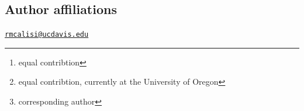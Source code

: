\newpage

\newpage

\hypertarget{author-affiliations}{%
\subsection{Author affiliations}\label{author-affiliations}}


\address{%
Rayna M Harris \footnote{equal contribtion}\\
University of California, Davis\\
\\
}


\address{%
Suzanne H. Austin \footnote{equal contribtion, currently at the
  University of Oregon}\\
University of California, Davis\\
\\
}


\address{%
Andrew S. Lang\\
University of New Hampshire\\
\\
}


\address{%
Victoria S. Farrar\\
University of California, Davis\\
\\
}


\address{%
April Booth\\
University of California, Davis\\
\\
}


\address{%
Tanner Feustel\\
University of California, Davis\\
\\
}


\address{%
Matthew D. MacManes\\
University of New Hampshire\\
\\
}


\address{%
Rebecca M. Calisi \footnote{corresponding author}\\
University of California, Davis\\
\\
}
\href{mailto:rmcalisi@ucdavis.edu}{\nolinkurl{rmcalisi@ucdavis.edu}}

